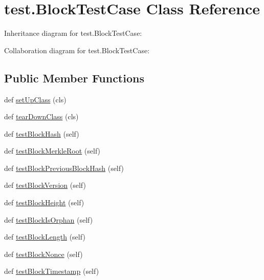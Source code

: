 \hypertarget{classtest_1_1BlockTestCase}{}\section{test.\+Block\+Test\+Case Class Reference}
\label{classtest_1_1BlockTestCase}


Inheritance diagram for test.\+Block\+Test\+Case\+:


Collaboration diagram for test.\+Block\+Test\+Case\+:
\subsection*{Public Member Functions}
\begin{DoxyCompactItemize}
\item 
def \hyperlink{classtest_1_1BlockTestCase_a0c98bf2645b826cf78969424893fbda2}{set\+Up\+Class} (cls)
\item 
def \hyperlink{classtest_1_1BlockTestCase_ade517b464db1a39ecf2b5afe6e055a51}{tear\+Down\+Class} (cls)
\item 
def \hyperlink{classtest_1_1BlockTestCase_a8ed16b258f59614c8c85a4544c63e6dc}{test\+Block\+Hash} (self)
\item 
def \hyperlink{classtest_1_1BlockTestCase_ae0e8e6af5db7f6e7ac395c896da25e7f}{test\+Block\+Merkle\+Root} (self)
\item 
def \hyperlink{classtest_1_1BlockTestCase_a08c78ae2a1f025d37bac9af577f61733}{test\+Block\+Previous\+Block\+Hash} (self)
\item 
def \hyperlink{classtest_1_1BlockTestCase_a1ade81aba4bfef624be676d47b1dbeb6}{test\+Block\+Version} (self)
\item 
def \hyperlink{classtest_1_1BlockTestCase_a37e5dd128418488d062ca1891177d923}{test\+Block\+Height} (self)
\item 
def \hyperlink{classtest_1_1BlockTestCase_a13bbdc381317e1d67661e4642627c8cb}{test\+Block\+Is\+Orphan} (self)
\item 
def \hyperlink{classtest_1_1BlockTestCase_ab01e1cb70fb6a7c6faee760a982490b1}{test\+Block\+Length} (self)
\item 
def \hyperlink{classtest_1_1BlockTestCase_a63db74b9ddda721e605e59dacad1fc21}{test\+Block\+Nonce} (self)
\item 
def \hyperlink{classtest_1_1BlockTestCase_a16b138e2b1a1662759cd6651d8d107f1}{test\+Block\+Timestamp} (self)
\end{DoxyCompactItemize}


